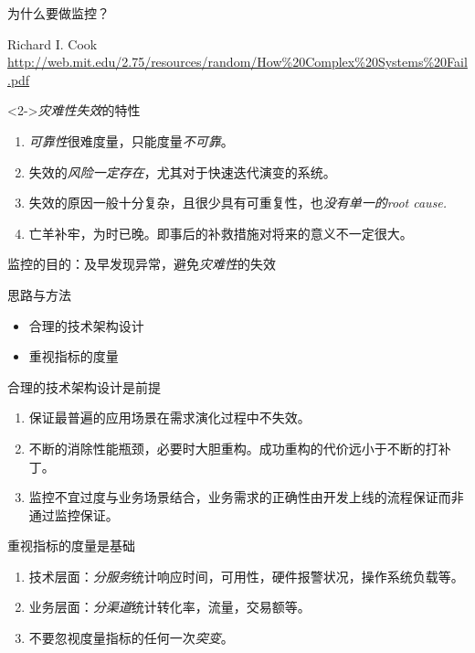 \documentclass[handout]{beamer}
\begin{document}
\begin{CJK}{UTF8}{gbsn}
\begin{frame}{为什么要做监控？}
\begin{thebibliography}{10}
  \beamertemplatearticlebibitems

    Richard I. Cook
    \newblock \url{http://web.mit.edu/2.75/resources/random/How\%20Complex\%20Systems\%20Fail.pdf}

  \end{thebibliography}

  \beamertemplate

  \begin{block}<2->{\emph {灾难性失效}的特性}
    \begin{enumerate}
    \item<2> {\emph{可靠性}很难度量，只能度量\emph{不可靠}。}
    \item<3> {失效的\emph{风险一定存在}，尤其对于快速迭代演变的系统。}
    \item<4-> {失效的原因一般十分复杂，且很少具有可重复性，也\emph{没有单一的root cause.}}
    \item<5-> {亡羊补牢，为时已晚。即事后的补救措施对将来的意义不一定很大。}
    \end{enumerate}
  \end{block}

\end{frame}

\begin{frame}{监控的目的：及早发现异常，避免\emph {灾难性}的失效}
  \begin{block}{思路与方法}
    \begin{itemize}
    \item {合理的技术架构设计}
    \item {重视指标的度量}
    \end{itemize}
  \end{block}
\end{frame}

\begin{frame}{合理的技术架构设计是前提}
  \begin{enumerate}
  \item<1-> {保证最普遍的应用场景在需求演化过程中不失效。}
  \item<2-> {不断的消除性能瓶颈，必要时大胆重构。成功重构的代价远小于不断的打补丁。}
  \item<3-> {监控不宜过度与业务场景结合，业务需求的正确性由开发上线的流程保证而非通过监控保证。}
  \end{enumerate}
\end{frame}

\begin{frame}{重视指标的度量是基础}
  \begin{enumerate}
  \item<1-> {技术层面：\emph{分服务}统计响应时间，可用性，硬件报警状况，操作系统负载等。}
  \item<2-> {业务层面：\emph{分渠道}统计转化率，流量，交易额等。}
  \item<3-> {不要忽视度量指标的任何一次\emph{突变}。}
  \end{enumerate}
\end{frame}

\end{CJK}
\end{document}
